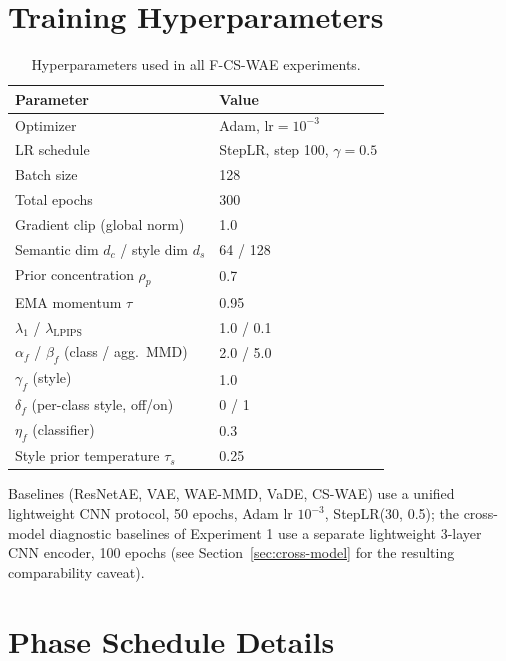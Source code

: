 \documentclass[10pt,letterpaper]{article}
\newcommand{\ours}{F-CS-WAE}
\newcommand{\simple}{CS-WAE}
\begin{document}
\section{Training Hyperparameters}
\label{app:training}

\begin{table}[h]
\centering
\small
\caption{Hyperparameters used in all \ours{} experiments.}
\label{tab:hyperparams}
\begin{tabular}{ll}
\toprule
Parameter & Value \\
\midrule
Optimizer & Adam, $\mathrm{lr}=10^{-3}$ \\
LR schedule & StepLR, step 100, $\gamma=0.5$ \\
Batch size & 128 \\
Total epochs & 300 \\
Gradient clip (global norm) & 1.0 \\
Semantic dim $d_c$ / style dim $d_s$ & 64 / 128 \\
Prior concentration $\rho_p$ & 0.7 \\
EMA momentum $\tau$ & 0.95 \\
$\lambda_1$ / $\lambda_{\mathrm{LPIPS}}$ & 1.0 / 0.1 \\
$\alpha_f$ / $\beta_f$ (class / agg.\ MMD) & 2.0 / 5.0 \\
$\gamma_f$ (style) & 1.0 \\
$\delta_f$ (per-class style, off/on) & 0 / 1 \\
$\eta_f$ (classifier) & 0.3 \\
Style prior temperature $\tau_s$ & 0.25 \\
\bottomrule
\end{tabular}
\end{table}

Baselines (ResNetAE, VAE, WAE-MMD, VaDE, \simple{}) use a unified
lightweight CNN protocol, 50 epochs, Adam lr $10^{-3}$, StepLR(30, 0.5); the
cross-model diagnostic baselines of Experiment 1 use a separate lightweight
3-layer CNN encoder, 100 epochs (see Section~\ref{sec:cross-model} for the
resulting comparability caveat).

\section{Phase Schedule Details}
\label{app:schedule}
\end{document}
